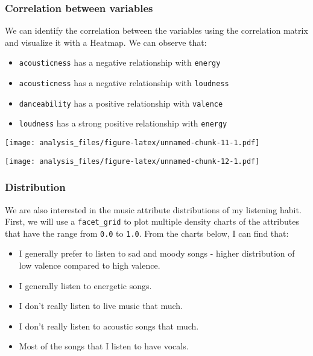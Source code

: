 \documentclass[
]{article}
\begin{document}
\hypertarget{correlation-between-variables}{%
\subsubsection{Correlation between
variables}\label{correlation-between-variables}}

We can identify the correlation between the variables using the
correlation matrix and visualize it with a Heatmap. We can observe that:

\begin{itemize}
\item
  \texttt{acousticness} has a negative relationship with \texttt{energy}
\item
  \texttt{acousticness} has a negative relationship with
  \texttt{loudness}
\item
  \texttt{danceability} has a positive relationship with
  \texttt{valence}
\item
  \texttt{loudness} has a strong positive relationship with
  \texttt{energy}
\end{itemize}

\texttt{[image: analysis\_files/figure-latex/unnamed-chunk-11-1.pdf]}

\texttt{[image: analysis\_files/figure-latex/unnamed-chunk-12-1.pdf]}

\hypertarget{distribution}{%
\subsubsection{Distribution}\label{distribution}}

We are also interested in the music attribute distributions of my
listening habit. First, we will use a \texttt{facet\_grid} to plot
multiple density charts of the attributes that have the range from
\texttt{0.0} to \texttt{1.0}. From the charts below, I can find that:

\begin{itemize}
\item
  I generally prefer to listen to sad and moody songs - higher
  distribution of low valence compared to high valence.
\item
  I generally listen to energetic songs.
\item
  I don't really listen to live music that much.
\item
  I don't really listen to acoustic songs that much.
\item
  Most of the songs that I listen to have vocals.
\end{itemize}
\end{document}
